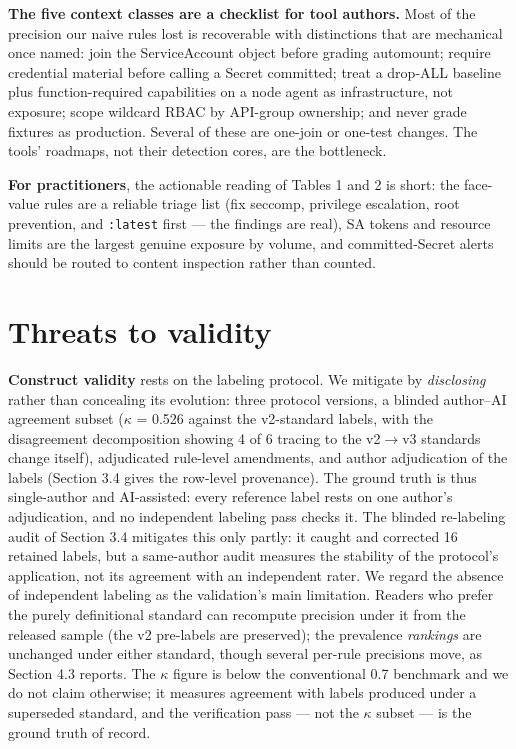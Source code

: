 \documentclass[pdflatex,sn-basic]{sn-jnl}
\begin{document}
\textbf{The five context classes are a checklist for tool authors.} Most
of the precision our naive rules lost is recoverable with distinctions
that are mechanical once named: join the ServiceAccount object before
grading automount; require credential material before calling a Secret
committed; treat a drop-ALL baseline plus function-required capabilities
on a node agent as infrastructure, not exposure; scope wildcard RBAC by
API-group ownership; and never grade fixtures as production. Several of
these are one-join or one-test changes. The tools' roadmaps, not their
detection cores, are the bottleneck.

\textbf{For practitioners}, the actionable reading of Tables 1 and 2 is
short: the face-value rules are a reliable triage list (fix seccomp,
privilege escalation, root prevention, and \texttt{:latest} first ---
the findings are real), SA tokens and resource limits are the largest
genuine exposure by volume, and committed-Secret alerts should be routed
to content inspection rather than counted.

\hypertarget{threats-to-validity}{%
\section{Threats to validity}\label{threats-to-validity}}

\textbf{Construct validity} rests on the labeling protocol. We mitigate
by \emph{disclosing} rather than concealing its evolution: three
protocol versions, a blinded author--AI agreement subset ($\kappa$ = 0.526
against the v2-standard labels, with the disagreement decomposition
showing 4 of 6 tracing to the v2$\rightarrow$v3 standards change itself),
adjudicated rule-level amendments, and author adjudication of the labels
(Section 3.4 gives the row-level provenance). The ground truth is thus
single-author and AI-assisted: every reference label rests on one
author's adjudication, and no independent labeling pass checks it. The blinded re-labeling audit of Section 3.4 mitigates this only partly: it caught and corrected 16 retained labels, but a same-author audit measures the stability of the protocol's application, not its agreement with an independent rater. We regard the absence of independent labeling as the validation's main limitation.
Readers who prefer the purely definitional standard can recompute
precision under it from the released sample (the v2 pre-labels are
preserved); the prevalence \emph{rankings} are unchanged under either
standard, though several per-rule precisions move, as Section 4.3
reports. The $\kappa$ figure is below the conventional 0.7 benchmark and we do
not claim otherwise; it measures agreement with labels produced under a
superseded standard, and the verification pass --- not the $\kappa$ subset ---
is the ground truth of record.
\end{document}
